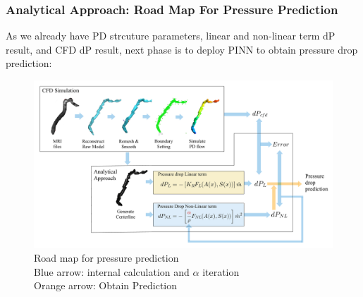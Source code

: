 \documentclass{beamer}
\begin{document}
\begin{frame}
    \fontsize{8pt}{10pt}\selectfont
    \frametitle{Analytical Approach: Road Map For Pressure Prediction }

    As we already have PD strcuture parameters,
    linear and non-linear term dP result, and CFD
    dP result,
    next phase is to deploy PINN to obtain 
    pressure drop prediction:
    \begin{figure}[H]
        \centering
        \includegraphics[width=\textwidth]{figures/Process-Total.jpg}
        \caption{\footnotesize{Road map for pressure prediction \\
            Blue arrow: internal calculation and $\alpha$ iteration \\
            Orange arrow: Obtain Prediction}
        }
    \end{figure}

    
\end{frame}
\end{document}
